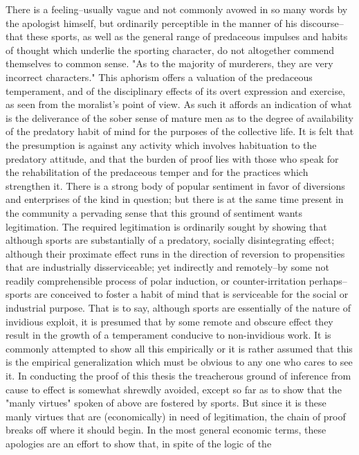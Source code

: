 \documentclass[12pt]{report}
\begin{document}
There is a feeling--usually vague and not commonly avowed in so many
words by the apologist himself, but ordinarily perceptible in the manner
of his discourse--that these sports, as well as the general range of
predaceous impulses and habits of thought which underlie the sporting
character, do not altogether commend themselves to common sense. "As
to the majority of murderers, they are very incorrect characters." This
aphorism offers a valuation of the predaceous temperament, and of the
disciplinary effects of its overt expression and exercise, as seen from
the moralist's point of view. As such it affords an indication of what
is the deliverance of the sober sense of mature men as to the degree
of availability of the predatory habit of mind for the purposes of the
collective life. It is felt that the presumption is against any activity
which involves habituation to the predatory attitude, and that the
burden of proof lies with those who speak for the rehabilitation of the
predaceous temper and for the practices which strengthen it. There is a
strong body of popular sentiment in favor of diversions and enterprises
of the kind in question; but there is at the same time present in
the community a pervading sense that this ground of sentiment wants
legitimation. The required legitimation is ordinarily sought by
showing that although sports are substantially of a predatory, socially
disintegrating effect; although their proximate effect runs in
the direction of reversion to propensities that are industrially
disserviceable; yet indirectly and remotely--by some not readily
comprehensible process of polar induction, or counter-irritation
perhaps--sports are conceived to foster a habit of mind that is
serviceable for the social or industrial purpose. That is to say,
although sports are essentially of the nature of invidious exploit, it
is presumed that by some remote and obscure effect they result in the
growth of a temperament conducive to non-invidious work. It is commonly
attempted to show all this empirically or it is rather assumed that this
is the empirical generalization which must be obvious to any one who
cares to see it. In conducting the proof of this thesis the treacherous
ground of inference from cause to effect is somewhat shrewdly avoided,
except so far as to show that the "manly virtues" spoken of above
are fostered by sports. But since it is these manly virtues that are
(economically) in need of legitimation, the chain of proof breaks
off where it should begin. In the most general economic terms, these
apologies are an effort to show that, in spite of the logic of the
\end{document}
